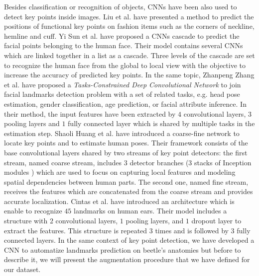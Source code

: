 \documentclass[review]{elsarticle}
\begin{document}
 
Besides classification or recognition of objects, CNNs have been also
used to detect key points inside images. Liu et
al. \cite{liu2016fashion} have presented a method to predict the
positions of functional key points on fashion items such as the
corners of neckline, hemline and cuff. Yi Sun et
al. \cite{sun2013deep} have proposed a CNNs cascade to predict the
facial points belonging to the human face. Their model contains several CNNs which are linked together in a list
as a cascade. Three levels of the cascade are set to recognize the
human face from the global to local view with the objective to
increase the accuracy of predicted key points. In the same topic,
Zhanpeng Zhang et al. \cite{zhang2014facial} have proposed a
\textit{Tasks-Constrained Deep Convolutional Network} to join facial
landmarks detection problem with a set of related tasks, e.g. head
pose estimation, gender classification, age prediction, or facial
attribute inference. In their method, the input features have been
extracted by $4$ convolutional layers, $3$ pooling layers and $1$
fully connected layer which is shared by  multiple tasks in the
estimation step. Shaoli Huang et al. \cite{huang2017coarse} have
introduced a coarse-fine network to locate key points and to estimate
human poses. Their framework consists of the base convolutional layers
shared by two streams of key point detectors: the first stream, named
coarse stream, includes $3$ detector branches (3 stacks of Inception
modules \cite{szegedy2015going}) which are used to focus on capturing
local features and modeling spatial dependencies between human
parts. The second one, named fine stream, receives the  features which
are concatenated from the coarse stream and provides accurate
localization. Cintas et al. \cite{cintas2016automatic} have introduced
an architecture which is enable to recognize $45$ landmarks on human
ears. Their model includes a structure with $2$ convolutional layers,
$1$ pooling layers, and $1$ dropout layer to extract the
features. This structure is repeated $3$ times and is followed by 3
fully connected layers. In the same context of key point detection, we
have developed a CNN to automatize landmarks prediction on beetle's
anatomies but before to describe it, we will present the augmentation
procedure that we have defined for our dataset.



\end{document}
